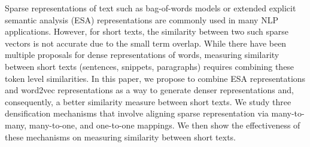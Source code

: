 Sparse representations of text such as bag-of-words models or extended explicit semantic analysis (ESA) representations are commonly used in many NLP applications. However, for short texts, the similarity between two such sparse vectors is not accurate due to the small term overlap. While there have been multiple proposals for dense representations of words, measuring similarity between short texts (sentences, snippets, paragraphs) requires combining these token level similarities. In this paper, we propose to combine ESA representations and word2vec representations as a way to generate denser representations and, consequently, a better similarity measure between short texts. We study three densification mechanisms that involve aligning sparse representation via many-to-many, many-to-one, and one-to-one mappings. We then show the effectiveness of these mechanisms on measuring similarity between short texts.

